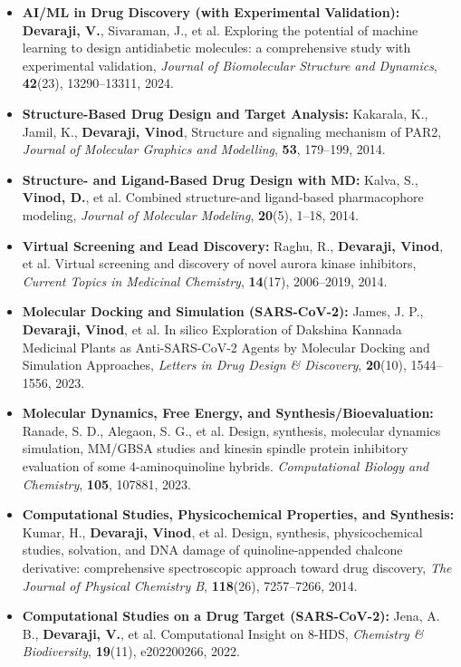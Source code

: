 \documentclass[10pt,a4paper,ragged2e,withhyper]{altacv}
\begin{document}
\begin{itemize}
    \item \textbf{AI/ML in Drug Discovery (with Experimental Validation):} \textbf{Devaraji, V.}, Sivaraman, J., et al. Exploring the potential of machine learning to design antidiabetic molecules: a comprehensive study with experimental validation, \textit{Journal of Biomolecular Structure and Dynamics}, \textbf{42}(23), 13290--13311, 2024.
    \item \textbf{Structure-Based Drug Design and Target Analysis:} Kakarala, K., Jamil, K., \textbf{Devaraji, Vinod}, Structure and signaling mechanism of PAR2, \textit{Journal of Molecular Graphics and Modelling}, \textbf{53}, 179--199, 2014.
    \item \textbf{Structure- and Ligand-Based Drug Design with MD:} Kalva, S., \textbf{Vinod, D.}, et al. Combined structure-and ligand-based pharmacophore modeling, \textit{Journal of Molecular Modeling}, \textbf{20}(5), 1--18, 2014.
    \item \textbf{Virtual Screening and Lead Discovery:} Raghu, R., \textbf{Devaraji, Vinod}, et al. Virtual screening and discovery of novel aurora kinase inhibitors, \textit{Current Topics in Medicinal Chemistry}, \textbf{14}(17), 2006--2019, 2014.
    \item \textbf{Molecular Docking and Simulation (SARS-CoV-2):} James, J. P., \textbf{Devaraji, Vinod}, et al. In silico Exploration of Dakshina Kannada Medicinal Plants as Anti-SARS-CoV-2 Agents by Molecular Docking and Simulation Approaches, \textit{Letters in Drug Design \& Discovery}, \textbf{20}(10), 1544--1556, 2023.
    \item \textbf{Molecular Dynamics, Free Energy, and Synthesis/Bioevaluation:} Ranade, S. D., Alegaon, S. G., et al. Design, synthesis, molecular dynamics simulation, MM/GBSA studies and kinesin spindle protein inhibitory evaluation of some 4-aminoquinoline hybrids. \textit{Computational Biology and Chemistry}, \textbf{105}, 107881, 2023.
    \item \textbf{Computational Studies, Physicochemical Properties, and Synthesis:} Kumar, H., \textbf{Devaraji, Vinod}, et al. Design, synthesis, physicochemical studies, solvation, and DNA damage of quinoline-appended chalcone derivative: comprehensive spectroscopic approach toward drug discovery, \textit{The Journal of Physical Chemistry B}, \textbf{118}(26), 7257--7266, 2014.
    \item \textbf{Computational Studies on a Drug Target (SARS-CoV-2):} Jena, A. B., \textbf{Devaraji, V.}, et al. Computational Insight on 8-HDS, \textit{Chemistry \& Biodiversity}, \textbf{19}(11), e202200266, 2022.

\end{itemize}
\end{document}
